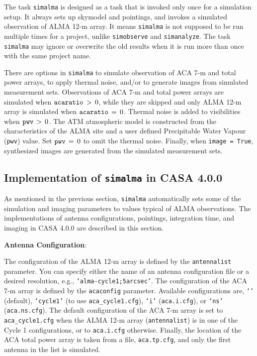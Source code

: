 The task {\tt simalma} is designed as a task that is invoked only once for
a simulation setup. 
It always sets up skymodel and pointings, and invokes a simulated
observation of ALMA 12-m array.
It means {\tt simalma} is not supposed to be run multiple times for a
project, unlike {\tt simobserve} and {\tt simanalyze}. 
The task {\tt simalma} may ignore or overwrite the old results when it is
run more than once with the same project name. 

There are options in {\tt simalma} to simulate
observation of ACA 7-m and total power arrays, to apply thermal noise, and/or
to generate images from simulated measurement sets. 
Observations of ACA 7-m and total power arrays are simulated when
$ {\tt acaratio} \, > \, 0 $, 
while they are skipped and only ALMA 12-m array is simulated when
$ {\tt acaratio} \, = \, 0 $.
Thermal noise is added to visibilities when $ {\tt pwv} \, > \, 0 $.
The ATM atmospheric model is constructed from the characteristics of
the ALMA site and a user defined Precipitable Water Vapour ({\tt pwv})
value. 
Set $ {\tt pwv} \, = \, 0 $ to omit the thermal noise. 
Finally, when {\tt image = True}, synthesized images are generated
from the simulated measurement sets.

\subsection{Implementation of {\tt simalma} in CASA 4.0.0}
\label{section:sim.simalma.casa400}

As mentioned in the previous section, {\tt simalma} automatically sets
some of the simulation and imaging parameters to values typical of ALMA
observations. The implementations of antenna configurations, pointings,
integration time, and imaging in CASA 4.0.0 are described in this
section.

\smallskip
{\bf Antenna Configuration}:

The configuration of the ALMA 12-m array is defined by the {\tt antennalist}
parameter. You can specify either the name of an antenna configuration
file or a desired resolution, e.g., {\tt `alma-cycle1;5arcsec'}. 
The configuration of the ACA 7-m array is defined by the {\tt acaconfig}
parameter. Available configurations are, {\tt `'} (default),
{\tt `cycle1'} (to use {\tt aca\_cycle1.cfg}),
{\tt `i'} ({\tt aca.i.cfg}), or
{\tt `ns'} ({\tt aca.ns.cfg}). The default
configuration of the ACA 7-m array is set to {\tt aca\_cycle1.cfg}
when the ALMA 12-m array ({\tt antennalist}) is in one of the Cycle 1
configurations, or to {\tt aca.i.cfg} otherwise.
Finally, the location of the ACA total power array is
taken from a file, {\tt aca.tp.cfg}, and only the first antenna
in the list is simulated.


